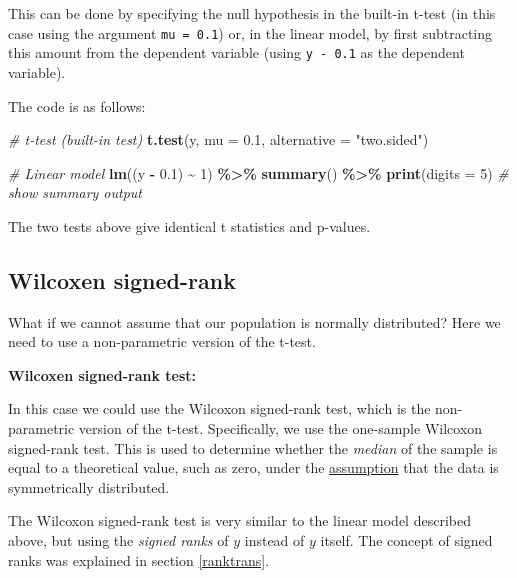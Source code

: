 \documentclass[
  12pt,
]{krantz}
\newenvironment{Shaded}{\begin{snugshade}}{\end{snugshade}}
\newcommand{\CommentTok}[1]{\textcolor[rgb]{0.56,0.35,0.01}{\textit{#1}}}
\newcommand{\DataTypeTok}[1]{\textcolor[rgb]{0.13,0.29,0.53}{#1}}
\newcommand{\DecValTok}[1]{\textcolor[rgb]{0.00,0.00,0.81}{#1}}
\newcommand{\FloatTok}[1]{\textcolor[rgb]{0.00,0.00,0.81}{#1}}
\newcommand{\KeywordTok}[1]{\textcolor[rgb]{0.13,0.29,0.53}{\textbf{#1}}}
\newcommand{\NormalTok}[1]{#1}
\newcommand{\OperatorTok}[1]{\textcolor[rgb]{0.81,0.36,0.00}{\textbf{#1}}}
\newcommand{\StringTok}[1]{\textcolor[rgb]{0.31,0.60,0.02}{#1}}
\begin{document}
This can be done by specifying the null hypothesis in the built-in t-test (in this case using the argument \texttt{mu\ =\ 0.1}) or, in the linear model, by first subtracting this amount from the dependent variable (using \texttt{y\ -\ 0.1} as the dependent variable).

The code is as follows:

\begin{Shaded}
\begin{Highlighting}[]
\CommentTok{\# t{-}test (built{-}in test)}
\KeywordTok{t.test}\NormalTok{(y, }\DataTypeTok{mu =} \FloatTok{0.1}\NormalTok{, }\DataTypeTok{alternative =} \StringTok{"two.sided"}\NormalTok{)}

\CommentTok{\# Linear model}
\KeywordTok{lm}\NormalTok{((y }\OperatorTok{{-}}\StringTok{ }\FloatTok{0.1}\NormalTok{) }\OperatorTok{\textasciitilde{}}\StringTok{ }\DecValTok{1}\NormalTok{) }\OperatorTok{\%\textgreater{}\%}
\StringTok{  }\KeywordTok{summary}\NormalTok{() }\OperatorTok{\%\textgreater{}\%}
\StringTok{  }\KeywordTok{print}\NormalTok{(}\DataTypeTok{digits =} \DecValTok{5}\NormalTok{) }\CommentTok{\# show summary output}
\end{Highlighting}
\end{Shaded}

The two tests above give identical t statistics and p-values.

\hypertarget{wilcoxen-signed-rank}{%
\subsection{Wilcoxen signed-rank}\label{wilcoxen-signed-rank}}

What if we cannot assume that our population is normally distributed? Here we need to use a non-parametric version of the t-test.

\textbf{Wilcoxen signed-rank test:}

In this case we could use the Wilcoxon signed-rank test, which is the non-parametric version of the t-test. Specifically, we use the one-sample Wilcoxon signed-rank test. This is used to determine whether the \emph{median} of the sample is equal to a theoretical value, such as zero, under the \href{http://www.sthda.com/english/wiki/one-sample-wilcoxon-signed-rank-test-in-r}{assumption} that the data is symmetrically distributed.

The Wilcoxon signed-rank test is very similar to the linear model described above, but using the \emph{signed ranks} of \(y\) instead of \(y\) itself. The concept of signed ranks was explained in section \ref{ranktrans}.
\end{document}
